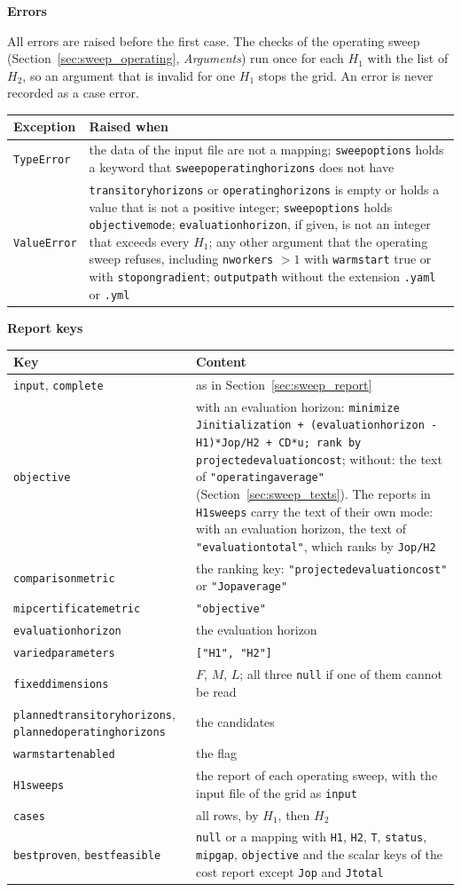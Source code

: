 \documentclass[11pt,a4paper]{article}
\makeatletter
\theoremstyle{plain}
\theoremstyle{definition}
\newcommand{\blockhead}[1]{\par\noindent\textbf{#1}\par\nobreak}
\renewcommand{\_}{\textunderscore\allowbreak{}}
\providecommand{\rejrow}[2]{{\raggedright #1\par} & {\raggedright #2\par} \\}
\providecommand{\tabstart}[2]{\begingroup\small\begin{longtable}{@{}#1@{}}\toprule #2 \\ \midrule \endhead}
\providecommand{\tabend}{\bottomrule\end{longtable}\endgroup}
\makeatother
\begin{document}
\blockhead{Errors}
All errors are raised before the first case. The checks of the operating sweep (Section~\ref{sec:sweep_operating}, \emph{Arguments}) run once for each $H_1$ with the list of $H_2$, so an argument that is invalid for one $H_1$ stops the grid. An error is never recorded as a case error.
\tabstart{p{3.4cm}p{11.6cm}}{Exception & Raised when}
\rejrow{\texttt{TypeError}}{the data of the input file are not a mapping; \texttt{sweep\_options} holds a keyword that \texttt{sweep\_operating\_horizons} does not have}
\rejrow{\texttt{ValueError}}{\texttt{transitory\_horizons} or \texttt{operating\_horizons} is empty or holds a value that is not a positive integer; \texttt{sweep\_options} holds \texttt{objective\_mode}; \texttt{evaluation\_horizon}, if given, is not an integer that exceeds every $H_1$; any other argument that the operating sweep refuses, including \texttt{n\_workers} $> 1$ with \texttt{warm\_start} true or with \texttt{stop\_on\_gradient}; \texttt{output\_path} without the extension \texttt{.yaml} or \texttt{.yml}}
\tabend

\blockhead{Report keys}
\tabstart{p{5.2cm}p{9.8cm}}{Key & Content}
\rejrow{\texttt{input}, \texttt{complete}}{as in Section~\ref{sec:sweep_report}}
\rejrow{\texttt{objective}}{with an evaluation horizon: \texttt{minimize J\_initialization + (evaluation\_horizon - H1)*J\_op/H2 + C\_D*u; rank by projected\_evaluation\_cost}; without: the text of \texttt{"operating\_average"} (Section~\ref{sec:sweep_texts}). The reports in \texttt{H1\_sweeps} carry the text of their own mode: with an evaluation horizon, the text of \texttt{"evaluation\_total"}, which ranks by \texttt{J\_op/H2}}
\rejrow{\texttt{comparison\_metric}}{the ranking key: \texttt{"projected\_evaluation\_cost"} or \texttt{"J\_op\_average"}}
\rejrow{\texttt{mip\_certificate\_metric}}{\texttt{"objective"}}
\rejrow{\texttt{evaluation\_horizon}}{the evaluation horizon}
\rejrow{\texttt{varied\_parameters}}{\texttt{["H1", "H2"]}}
\rejrow{\texttt{fixed\_dimensions}}{$F$, $M$, $L$; all three \texttt{null} if one of them cannot be read}
\rejrow{\texttt{planned\_transitory\_horizons}, \texttt{planned\_operating\_horizons}}{the candidates}
\rejrow{\texttt{warm\_start\_enabled}}{the flag}
\rejrow{\texttt{H1\_sweeps}}{the report of each operating sweep, with the input file of the grid as \texttt{input}}
\rejrow{\texttt{cases}}{all rows, by $H_1$, then $H_2$}
\rejrow{\texttt{best\_proven}, \texttt{best\_feasible}}{\texttt{null} or a mapping with \texttt{H1}, \texttt{H2}, \texttt{T}, \texttt{status}, \texttt{mip\_gap}, \texttt{objective} and the scalar keys of the cost report except \texttt{J\_op} and \texttt{J\_total}}
\tabend
\end{document}

